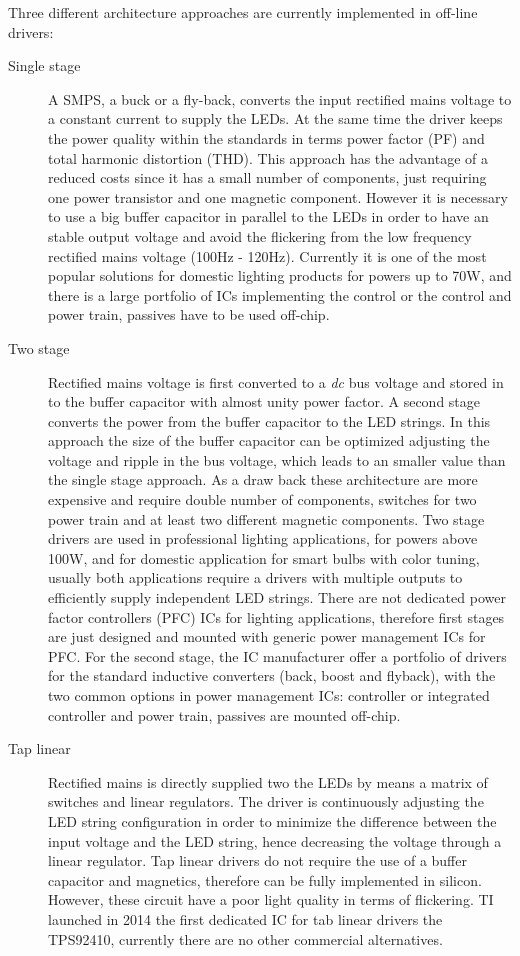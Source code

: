 Three different architecture approaches are currently implemented in off-line drivers:
\begin{description}
  \item[Single stage] A SMPS, a buck or a fly-back,  converts the input rectified mains voltage to a constant current to supply the LEDs. At the same time the driver keeps the power quality within the standards in terms power factor (PF) and total harmonic distortion (THD). This approach has the advantage of a reduced costs since it has a small number of components, just  requiring one power transistor and one magnetic component. However it is necessary to use a big buffer capacitor in parallel to the LEDs in order to have an stable output voltage and avoid the flickering from the low frequency rectified mains voltage (100Hz - 120Hz).  Currently it is one of the most popular solutions for domestic lighting products for powers up to 70W, and there is a large portfolio of ICs implementing the control or the control and power train, passives have to be used off-chip.

  \item[Two stage] Rectified mains voltage is first converted to a \emph{dc} bus voltage and stored in to the buffer capacitor with almost unity power factor. A second stage converts the power from the buffer capacitor to the LED strings. In this approach the size of the buffer capacitor can be optimized adjusting the voltage and ripple in the bus voltage, which leads to an smaller value than the single stage approach. As a draw back these architecture are more expensive and require double number of components, switches for two power train and at least two different magnetic components. Two stage drivers are used in professional lighting applications, for powers above 100W, and for domestic application for smart bulbs with color tuning, usually both applications require a drivers with  multiple outputs to efficiently supply independent LED strings. There are not dedicated power factor controllers (PFC) ICs  for lighting applications, therefore first stages are just designed and mounted with generic power management ICs for PFC. For the second stage, the IC manufacturer offer a portfolio of drivers for the standard inductive converters (back, boost and flyback),  with the two common options in power management ICs: controller or integrated controller and power train, passives are mounted off-chip.


  \item[Tap linear] Rectified mains is directly supplied two the LEDs by means a matrix of switches and linear regulators. The driver is continuously adjusting the LED string configuration in order to minimize the difference between the input voltage and the LED string, hence decreasing the voltage through a linear regulator. Tap linear drivers do not require the use of a buffer capacitor and magnetics, therefore can be fully implemented in silicon. However, these circuit have a poor light quality in terms of flickering. TI launched in 2014 the first dedicated IC for tab linear drivers the TPS92410, currently there are no other commercial alternatives.
\end{description}





